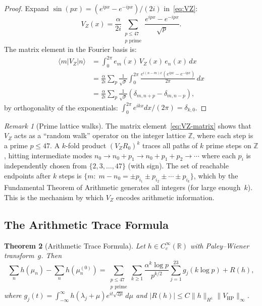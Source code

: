 \documentclass[11pt,a4paper]{article}
\theoremstyle{plain}
\newtheorem{theorem}{Theorem}[section]
\theoremstyle{remark}
\newtheorem{remark}[theorem]{Remark}
\newcommand{\Z}{\mathbb{Z}}
\newcommand{\R}{\mathbb{R}}
\newcommand{\norm}[1]{\lVert #1 \rVert}
\begin{document}
\begin{proof}
Expand $\sin(px)=(e^{ipx}-e^{-ipx})/(2i)$ in~\eqref{eq:VZ}:
\[
  V_Z(x)=\frac{\alpha}{2i}\sum_{\substack{p\leq 47\\p\text{ prime}}}
  \frac{e^{ipx}-e^{-ipx}}{\sqrt{p}}.
\]
The matrix element in the Fourier basis is:
\begin{align*}
  \langle m|V_Z|n\rangle
  &=\int_0^{2\pi}\overline{e_m(x)}\,V_Z(x)\,e_n(x)\,dx\\
  &=\frac{\alpha}{2i}\sum_p\frac{1}{\sqrt{p}}\int_0^{2\pi}
  \frac{e^{i(n-m)x}(e^{ipx}-e^{-ipx})}{2\pi}\,dx\\
  &=\frac{\alpha}{2i}\sum_p\frac{1}{\sqrt{p}}
  (\delta_{m,n+p}-\delta_{m,n-p}),
\end{align*}
by orthogonality of the exponentials: $\int_0^{2\pi}e^{ikx}dx/(2\pi)=\delta_{k,0}$.
\end{proof}

\begin{remark}[Prime lattice walks]\label{rem:prime-walks}
The matrix element~\eqref{eq:VZ-matrix} shows that $V_Z$ acts as a
``random walk'' operator on the integer lattice $\Z$, where each step
is a prime $p\leq 47$.  A $k$-fold product $(V_Z R_0)^k$ traces all
paths of $k$ prime steps on $\Z$, hitting intermediate modes
$n_0\to n_0+p_1\to n_0+p_1+p_2\to\cdots$ where each $p_i$ is
independently chosen from $\{2,3,\ldots,47\}$ (with sign).
The set of reachable endpoints after $k$ steps is $\{m:\;m-n_0=
\pm p_{i_1}\pm p_{i_2}\pm\cdots\pm p_{i_k}\}$, which by the
Fundamental Theorem of Arithmetic generates all integers (for large
enough~$k$).  This is the mechanism by which $V_Z$ encodes arithmetic
information.
\end{remark}

\subsection{The Arithmetic Trace Formula}

\begin{theorem}[Arithmetic Trace Formula]\label{thm:trace-formula}
Let $h\in C_c^\infty(\R)$ with Paley--Wiener transform~$g$. Then
\begin{equation}\label{eq:trace-formula}
  \sum_n h(\mu_n)-\sum_n h(\mu_n^{(0)})
  =\sum_{\substack{p\leq 47\\p\text{ prime}}}\sum_{k\geq 1}
  \frac{\alpha^k\log p}{p^{k/2}}\sum_{j=1}^{23}g_j(k\log p)+R(h),
\end{equation}
where $g_j(t)=\int_{-\infty}^\infty h(\lambda_j+\mu)e^{it\sqrt{2\mu}}\,d\mu$
and $|R(h)|\leq C\norm{h}_{H^1}\norm{V_{\mathrm{HP}}}_\infty$.
\end{theorem}
\end{document}
